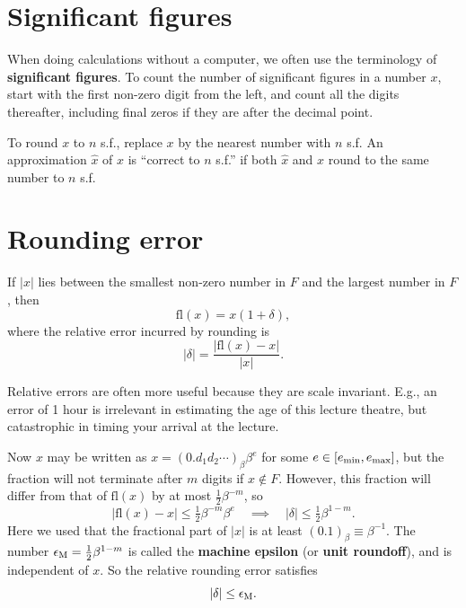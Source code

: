 \documentclass[
  letterpaper,
  DIV=11,
  numbers=noendperiod]{scrreprt}
\begin{document}
\section{Significant figures}\label{significant-figures}

When doing calculations without a computer, we often use the terminology
of \textbf{significant figures}. To count the number of significant
figures in a number \(x\), start with the first non-zero digit from the
left, and count all the digits thereafter, including final zeros if they
are after the decimal point.

To round \(x\) to \(n\) s.f., replace \(x\) by the nearest number with
\(n\) s.f. An approximation \(\hat{x}\) of \(x\) is ``correct to \(n\)
s.f.'' if both \(\hat{x}\) and \(x\) round to the same number to \(n\)
s.f.

\section{Rounding error}\label{rounding-error}

If \(|x|\) lies between the smallest non-zero number in \(F\) and the
largest number in \(F\), then \[
\mathrm{fl}(x) = x(1+\delta),
\] where the relative error incurred by rounding is \[
|\delta| = \frac{|\mathrm{fl}(x) - x|}{|x|}.
\]

\begin{tcolorbox}[enhanced jigsaw, arc=.35mm, toprule=.15mm, colframe=quarto-callout-note-color-frame, left=2mm, toptitle=1mm, titlerule=0mm, breakable, opacityback=0, bottomtitle=1mm, title=\textcolor{quarto-callout-note-color}{\faInfo}\hspace{0.5em}{Note}, rightrule=.15mm, opacitybacktitle=0.6, colbacktitle=quarto-callout-note-color!10!white, colback=white, leftrule=.75mm, bottomrule=.15mm, coltitle=black]

Relative errors are often more useful because they are scale invariant.
E.g., an error of 1 hour is irrelevant in estimating the age of this
lecture theatre, but catastrophic in timing your arrival at the lecture.

\end{tcolorbox}

Now \(x\) may be written as \(x=(0.d_1d_2\cdots)_\beta\beta^e\) for some
\(e\in[e_{\rm min},e_{\rm max}]\), but the fraction will not terminate
after \(m\) digits if \(x\notin F\). However, this fraction will differ
from that of \(\mathrm{fl}(x)\) by at most \(\tfrac12\beta^{-m}\), so \[
|\mathrm{fl}(x) - x| \leq \tfrac12\beta^{-m}\beta^e \quad \implies \quad |\delta| \leq \tfrac12\beta^{1-m}.
\] Here we used that the fractional part of \(|x|\) is at least
\((0.1)_\beta \equiv \beta^{-1}\). The number
\(\epsilon_{\rm M} = \tfrac12\beta^{1-m}\) is called the \textbf{machine
epsilon} (or \textbf{unit roundoff}), and is independent of \(x\). So
the relative rounding error satisfies \[
|\delta| \leq \epsilon_{\rm M}.
\]
\end{document}
